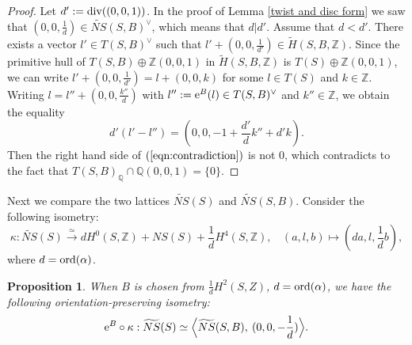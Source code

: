 \documentclass{article}
\theoremstyle{plain}
\newtheorem{proposition}[theorem]{Proposition}%
\theoremstyle{definition}
\theoremstyle{remark}
\newcommand{\Z}{{\mathbb Z}}
\newcommand{\Q}{{\mathbb Q}}
\begin{document}
\begin{proof}
Let 
$d' := {\rm div\/}((0, 0, 1))$. 
In the proof of Lemma \ref{twist and disc form} 
we saw that 
$(0, 0, \frac{1}{d}) \in \widetilde{NS}(S, B)^{\vee}$, 
which means that 
$d|d'$. 
Assume that $d<d'$. 
There exists a vector $l' \in T(S,B)^{\vee}$ 
such that 
$l' + (0, 0, \frac{1}{d'}) \in \widetilde{H}(S, B, {\Z})$. 
Since 
the primitive hull of 
$T(S, B) \oplus {\Z}(0, 0, 1)$ 
in 
$\widetilde{H}(S, B, {\Z})$ 
is 
$T(S) \oplus {\Z}(0, 0, 1)$, 
we can write 
$l' + (0, 0, \frac{1}{d'}) = l + (0, 0, k)$ 
for some 
$l \in T(S)$ and $k \in {\Z}$. 
Writing 
$l=l'' + (0, 0, \frac{k''}{d})$ 
with
$l'' := {\rm e\/}^{B}(l) \in T(S, B)^{\vee}$ and $k'' \in {\Z}$, 
we obtain the equality 
\begin{equation}\label{eqn:contradiction}
d'(l'-l'') = (0, 0, -1+\frac{d'}{d}k''+d'k).
\end{equation}
Then 
the right hand side of $(\ref{eqn:contradiction})$ 
is not $0$, 
which contradicts to the fact that 
$T(S, B)_{{\Q}} \cap {\Q}(0, 0, 1) = \{ 0 \}$. 
\end{proof} 







Next we compare the two lattices 
$\widetilde{NS}(S)$ and $\widetilde{NS}(S, B)$. 
Consider the following isometry: 
\begin{equation}\label{kappa} 
\kappa : 
\widetilde{NS}(S) 
\stackrel{\simeq}{\to} 
dH^{0}(S, {\Z}) + NS(S) + \frac{1}{d}H^{4}(S, {\Z}), \: \: \: \: 
(a, l, b) \mapsto (da, l, \frac{1}{d}b), 
\end{equation}
where 
$d = {\rm ord\/}(\alpha )$. 






\begin{proposition}\label{comparing}
When 
$B$ is chosen from $\frac{1}{d}H^{2}(S, {Z})$, 
$d = {\rm ord\/} (\alpha )$,  
we have the following orientation-preserving isometry: 
\begin{equation}\label{eqn:compare two NS}
{\rm e\/}^{B} \circ \kappa : 
\widetilde{NS}(S) \simeq 
\Bigl\langle \widetilde{NS}(S, B), \: (0, 0, -\frac{1}{d}) \Bigr\rangle . 
\end{equation}
\end{proposition}
\end{document}
